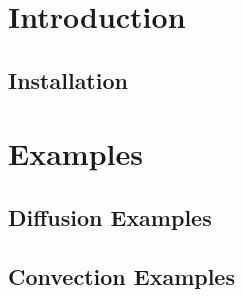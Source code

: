 \documentclass[letterpaper]{book}
\begin{document}
\mainmatter

\part{Introduction}

\parttoc

\chapter{Installation}





% 




\part{Examples}

\parttoc

\chapter{Diffusion Examples}


\newpage

\newpage

\newpage

\newpage

\newpage

\newpage

\newpage

\newpage

\newpage

\newpage

\newpage

\chapter{Convection Examples}
\end{document}
